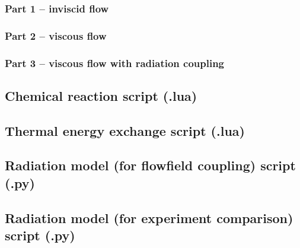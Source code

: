 \subsubsection{Part 1 -- inviscid flow}

\topbar

\bottombar

\subsubsection{Part 2 -- viscous flow}

\topbar

\bottombar

\subsubsection{Part 3 -- viscous flow with radiation coupling}

\topbar

\bottombar

\subsection{Chemical reaction script (.lua)}

\topbar

\bottombar

\subsection{Thermal energy exchange script (.lua)}

\topbar

\bottombar

\subsection{Radiation model (for flowfield coupling) script (.py)}

\topbar

\bottombar

\subsection{Radiation model (for experiment comparison) script (.py)}

